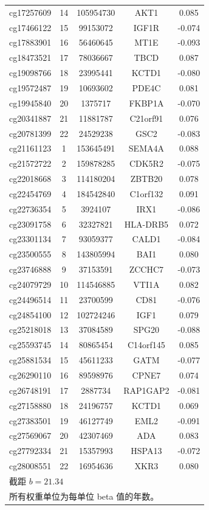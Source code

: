 \documentclass[12pt,a4paper,fontset=fandol]{ctexart}
\begin{document}
\begin{longtable}{|c|c|c|c|c|}
		cg17257609 & 14 & 105954730 & AKT1 & 0.085 \\
		cg17466122 & 15 & 99153072 & IGF1R & -0.074 \\
		cg17883901 & 16 & 56460645 & MT1E & -0.093 \\
		cg18473521 & 17 & 78036667 & TBCD & 0.087 \\
		cg19098766 & 18 & 23995441 & KCTD1 & -0.080 \\
		cg19572487 & 19 & 10693602 & PDE4C & 0.081 \\
		cg19945840 & 20 & 1375717 & FKBP1A & -0.070 \\
		cg20341887 & 21 & 11881787 & C21orf91 & 0.076 \\
		cg20781399 & 22 & 24529238 & GSC2 & -0.083 \\
		cg21161123 & 1 & 153645491 & SEMA4A & 0.088 \\
		cg21572722 & 2 & 159878285 & CDK5R2 & -0.075 \\
		cg22018668 & 3 & 114180204 & ZBTB20 & 0.078 \\
		cg22454769 & 4 & 184542840 & C1orf132 & 0.091 \\
		cg22736354 & 5 & 3924107 & IRX1 & -0.086 \\
		cg23091758 & 6 & 32327821 & HLA-DRB5 & 0.072 \\
		cg23301134 & 7 & 93059377 & CALD1 & -0.084 \\
		cg23500555 & 8 & 143805994 & BAI1 & 0.080 \\
		cg23746888 & 9 & 37153591 & ZCCHC7 & -0.073 \\
		cg24079729 & 10 & 114546885 & VTI1A & 0.082 \\
		cg24496514 & 11 & 23700599 & CD81 & -0.076 \\
		cg24854100 & 12 & 102724246 & IGF1 & 0.079 \\
		cg25218018 & 13 & 37084589 & SPG20 & -0.088 \\
		cg25593745 & 14 & 80865454 & C14orf145 & 0.085 \\
		cg25881534 & 15 & 45611233 & GATM & -0.077 \\
		cg26290110 & 16 & 89598976 & CPNE7 & 0.074 \\
		cg26748191 & 17 & 2887734 & RAP1GAP2 & -0.081 \\
		cg27158880 & 18 & 24196757 & KCTD1 & 0.069 \\
		cg27383501 & 19 & 46127749 & EML2 & -0.091 \\
		cg27569067 & 20 & 42307469 & ADA & 0.083 \\
		cg27792334 & 21 & 15357993 & HSPA13 & -0.072 \\
		cg28008551 & 22 & 16954636 & XKR3 & 0.080 \\
		\hline
		\multicolumn{5}{l}{\footnotesize 截距 \(b = 21.34\)} \\
		\multicolumn{5}{l}{\footnotesize 所有权重单位为每单位 beta 值的年数。} \\
	\end{longtable}
	
\end{document}
